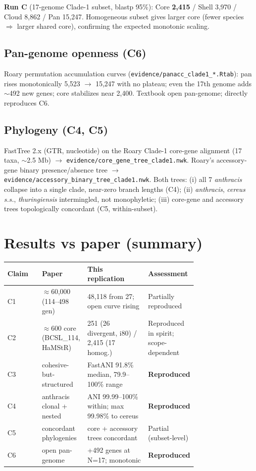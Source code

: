 \documentclass[11pt]{article}
\begin{document}
\textbf{Run C} (17-genome Clade-1 subset, blastp 95\%): Core \textbf{2{,}415} / Shell 3{,}970 / Cloud 8{,}862 / Pan 15{,}247. Homogeneous subset gives larger core (fewer species $\Rightarrow$ larger shared core), confirming the expected monotonic scaling.

\subsection{Pan-genome openness (C6)}
Roary permutation accumulation curves (\texttt{evidence/panacc\_clade1\_*.Rtab}): pan rises monotonically 5{,}523 $\to$ 15{,}247 with no plateau; even the 17th genome adds $\sim$492 new genes; core stabilizes near 2{,}400. Textbook open pan-genome; directly reproduces C6.

\subsection{Phylogeny (C4, C5)}
FastTree 2.x (GTR, nucleotide) on the Roary Clade-1 core-gene alignment (17 taxa, $\sim$2.5 Mb) $\to$ \texttt{evidence/core\_gene\_tree\_clade1.nwk}. Roary's accessory-gene binary presence/absence tree $\to$ \texttt{evidence/accessory\_binary\_tree\_clade1.nwk}. Both trees: (i) all 7 \emph{anthracis} collapse into a single clade, near-zero branch lengths (C4); (ii) \emph{anthracis}, \emph{cereus s.s.}, \emph{thuringiensis} intermingled, not monophyletic; (iii) core-gene and accessory trees topologically concordant (C5, within-subset).

\section{Results vs paper (summary)}
\begin{center}\begin{tabular}{lp{0.24\linewidth}p{0.32\linewidth}p{0.20\linewidth}}\toprule
Claim & Paper & This replication & Assessment \\ \midrule
C1 & $\approx$60{,}000 (114--498 gen) & 48{,}118 from 27; open curve rising & Partially reproduced \\
C2 & $\approx$600 core (BCSL\_114, HaMStR) & 251 (26 divergent, i80) / 2{,}415 (17 homog.) & Reproduced in spirit; scope-dependent \\
C3 & cohesive-but-structured & FastANI 91.8\% median, 79.9--100\% range & \textbf{Reproduced} \\
C4 & anthracis clonal + nested & ANI 99.99--100\% within; max 99.98\% to cereus & \textbf{Reproduced} \\
C5 & concordant phylogenies & core + accessory trees concordant & Partial (subset-level) \\
C6 & open pan-genome & +492 genes at N=17; monotonic & \textbf{Reproduced} \\
\bottomrule\end{tabular}\end{center}
\end{document}

